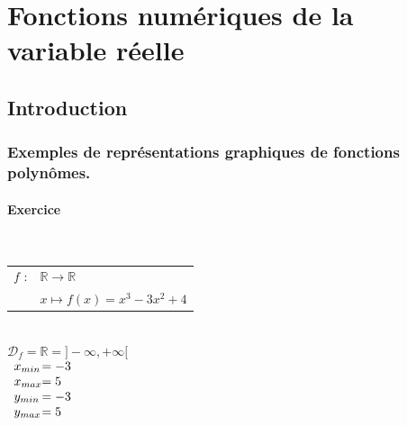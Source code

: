 \ifdefined\COMPLETE
\else
    
    
\fi

\vspace*{-2cm}





\section{Fonctions numériques de la variable réelle}

\subsection{Introduction}

\subsubsection{Exemples de représentations graphiques de fonctions polynômes.}

\paragraph{Exercice }%
~\\
 
\begin{tabular}{l@{$\;$ }l}
$f$ : & $ \mathbb{R} \longrightarrow \mathbb{R}$\\
      & $ x \longmapsto f(x) = x^3 -3x^2 +4$\\
\end{tabular}\\

$\mathscr{D}_f = \mathbb{R} = ] -\infty, +\infty [ $ \\

$
\begin{array}{l@{}l}
          x_{min} &= -3 \\
          x_{max} &= 5  \\
          y_{min} &= -3 \\
          y_{max} &= 5  \\
\end{array}
$

